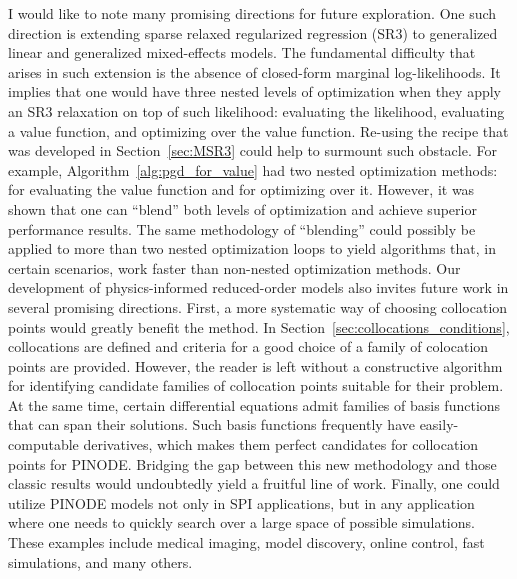 I would like to note many promising directions for future exploration. One such direction is extending sparse relaxed regularized regression (SR3) to generalized linear and generalized mixed-effects models. The fundamental difficulty that arises in such extension is the absence of closed-form marginal log-likelihoods. It implies that one would have three nested levels of optimization when they apply an SR3 relaxation on top of such likelihood: evaluating the likelihood, evaluating a value function, and optimizing over the value function. Re-using the recipe that was developed in Section~\ref{sec:MSR3} could help to surmount such obstacle. For example, Algorithm~\ref{alg:pgd_for_value} had two nested optimization methods: for evaluating the value function and for optimizing over it. However, it was shown that one can ``blend'' both levels of optimization and achieve superior performance results. The same methodology of ``blending'' could possibly be applied to more than two nested optimization loops to yield algorithms that, in certain scenarios, work faster than non-nested optimization methods. Our development of physics-informed reduced-order models also invites future work in several promising directions. First, a more systematic way of choosing collocation points would greatly benefit the method. In Section~\ref{sec:collocations_conditions}, collocations are defined and criteria for a good choice of a family of colocation points are provided. However, the reader is left without a constructive algorithm for identifying candidate families of collocation points suitable for their problem. At the same time, certain differential equations admit families of basis functions that can span their solutions. Such basis functions frequently have easily-computable derivatives, which makes them perfect candidates for collocation points for PINODE. Bridging the gap between this new methodology and those classic results would undoubtedly yield a fruitful line of work. Finally, one could utilize PINODE models not only in SPI applications, but in any application where one needs to quickly search over a large space of possible simulations. These examples include medical imaging, model discovery, online control, fast simulations, and many others.